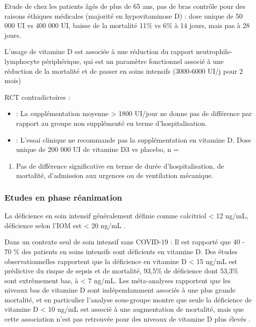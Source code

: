 \documentclass[
  a4paper,
  DIV=11,
  numbers=noendperiod,
  listof=totoc]{scrreprt}
\providecommand{\tightlist}{%
  \setlength{\itemsep}{0pt}\setlength{\parskip}{0pt}}\usepackage{longtable,booktabs,array}
\begin{document}
Etude de \textcite{Annweiler.2022} chez les patients âgés de plus de 65
ans, pas de bras contrôle pour des raisons éthiques médicales (majorité
en hypovitaminose D) : dose unique de 50 000 UI vs 400 000 UI, baisse de
la mortalité 11\% vs 6\% à 14 jours, mais pas à 28 jours.

L'usage de vitamine D est associée à une réduction du rapport
neutrophile-lymphocyte périphérique, qui est un paramètre fonctionnel
associé à une réduction de la mortalité et de passer en soins intensifs
(3000-6000 UI/j pour 2 mois) \autocite{Maghbooli.2021}

RCT contradictoires :

\begin{itemize}
\item
  \textcite{Cereda.2021} : La supplémentation moyenne \textgreater{}
  1800 UI/jour ne donne pas de différence par rapport au groupe non
  supplémenté en terme d'hospitalisation.
\item
  \textcite{Murai.2021} : L'essai clinique ne recommande pas la
  supplémentation en vitamine D. Dose unique de 200 000 UI de vitamine
  D3 vs placebo, n =
\end{itemize}

\begin{enumerate}
\def\labelenumi{\arabic{enumi}.}
\setcounter{enumi}{119}
\tightlist
\item
  Pas de différence significative en terme de durée d'hospitalisation,
  de mortalité, d'admission aux urgences ou de ventilation mécanique.
\end{enumerate}

\subsubsection{Etudes en phase
réanimation}\label{etudes-en-phase-ruxe9animation}

La déficience en soin intensif généralement définie comme calcitriol
\textless{} 12 ng/mL, déficience selon l'IOM est \textless{} 20 ng/mL
\autocite{Cutuli.2024}.

Dans un contexte seul de soin intensif sans COVID-19 : Il est rapporté
que 40 - 70 \% des patients en soins intensifs sont déficients en
vitamine D. Des études observationnelles rapportent que la déficience en
vitamine D \textless{} 15 ng/mL est prédictive du risque de sepsis et de
mortalité, 93,5\% de déficience dont 53,3\% sont extrêmement bas, à
\textless{} 7 ng/mL. Les méta-analyses rapportent que les niveaux bas de
vitamine D sont indépendamment associés à une plus grande mortalité, et
en particulier l'analyse sous-groupe montre que seule la déficience de
vitamine D \textless{} 10 ng/mL est associé à une augmentation de
mortalité, mais que cette association n'est pas retrouvée pour des
niveaux de vitamine D plus élevés \autocite{Cutuli.2024}.
\end{document}
